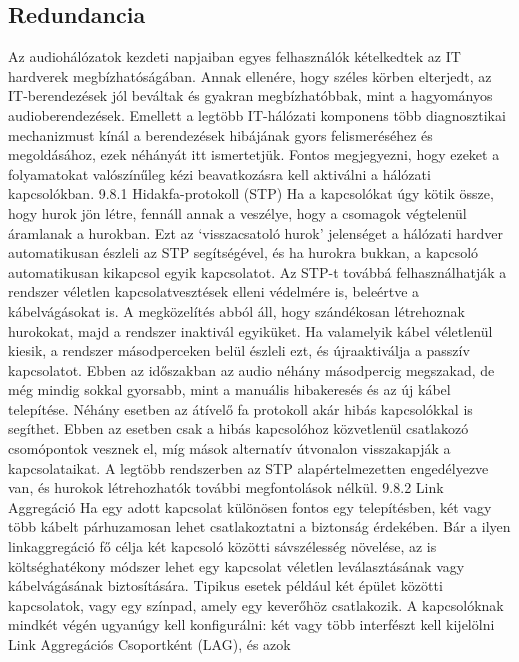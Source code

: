 \subsection{Redundancia}
Az audiohálózatok kezdeti napjaiban egyes felhasználók kételkedtek az IT
hardverek megbízhatóságában. Annak ellenére, hogy széles körben elterjedt, az
IT-berendezések jól beváltak és gyakran megbízhatóbbak, mint a hagyományos
audioberendezések. Emellett a legtöbb IT-hálózati komponens több diagnosztikai
mechanizmust kínál a berendezések hibájának gyors felismeréséhez és megoldásához,
ezek néhányát itt ismertetjük. Fontos megjegyezni, hogy ezeket a folyamatokat
valószínűleg kézi beavatkozásra kell aktiválni a hálózati kapcsolókban. 9.8.1
Hidakfa-protokoll (STP) Ha a kapcsolókat úgy kötik össze, hogy hurok jön létre,
fennáll annak a veszélye, hogy a csomagok végtelenül áramlanak a hurokban. Ezt
az `visszacsatoló hurok' jelenséget a hálózati hardver automatikusan észleli az
STP segítségével, és ha hurokra bukkan, a kapcsoló automatikusan kikapcsol egyik
kapcsolatot. Az STP-t továbbá felhasználhatják a rendszer véletlen
kapcsolatvesztések elleni védelmére is, beleértve a kábelvágásokat is. A
megközelítés abból áll, hogy szándékosan létrehoznak hurokokat, majd a rendszer
inaktivál egyiküket. Ha valamelyik kábel véletlenül kiesik, a rendszer
másodperceken belül észleli ezt, és újraaktiválja a passzív kapcsolatot. Ebben
az időszakban az audio néhány másodpercig megszakad, de még mindig sokkal
gyorsabb, mint a manuális hibakeresés és az új kábel telepítése. Néhány esetben
az átívelő fa protokoll akár hibás kapcsolókkal is segíthet. Ebben az esetben
csak a hibás kapcsolóhoz közvetlenül csatlakozó csomópontok vesznek el, míg
mások alternatív útvonalon visszakapják a kapcsolataikat. A legtöbb rendszerben
az STP alapértelmezetten engedélyezve van, és hurokok létrehozhatók további
megfontolások nélkül. 9.8.2 Link Aggregáció Ha egy adott kapcsolat különösen
fontos egy telepítésben, két vagy több kábelt párhuzamosan lehet csatlakoztatni
a biztonság érdekében. Bár a ilyen linkaggregáció fő célja két kapcsoló közötti
sávszélesség növelése, az is költséghatékony módszer lehet egy kapcsolat
véletlen leválasztásának vagy kábelvágásának biztosítására. Tipikus esetek
például két épület közötti kapcsolatok, vagy egy színpad, amely egy keverőhöz
csatlakozik. A kapcsolóknak mindkét végén ugyanúgy kell konfigurálni: két vagy
több interfészt kell kijelölni Link Aggregációs Csoportként (LAG), és azok
